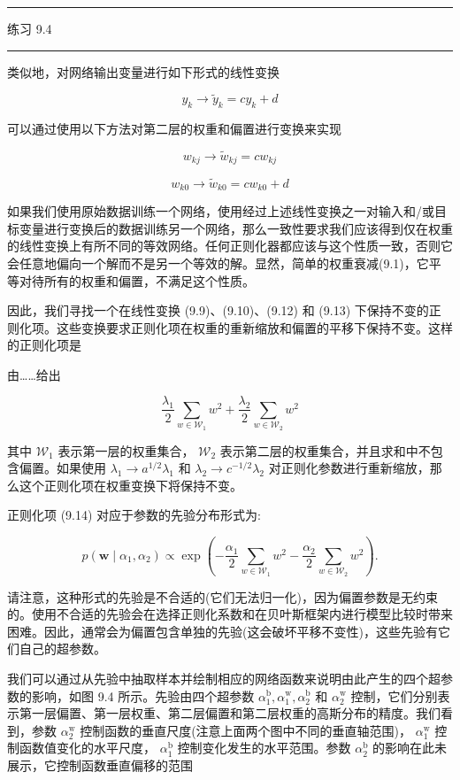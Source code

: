 \documentclass[10pt]{article}
\newcommand{\HRule}{\begin{center}\rule{0.9\linewidth}{0.2mm}\end{center}}
\begin{document}
\HRule

练习 9.4

\HRule

类似地，对网络输出变量进行如下形式的线性变换

\[
{y}_{k} \rightarrow  {\widetilde{y}}_{k} = c{y}_{k} + d \tag{9.11}
\]

可以通过使用以下方法对第二层的权重和偏置进行变换来实现

\[
{w}_{kj} \rightarrow  {\widetilde{w}}_{kj} = c{w}_{kj} \tag{9.12}
\]

\[
{w}_{k0} \rightarrow  {\widetilde{w}}_{k0} = c{w}_{k0} + d \tag{9.13}
\]

如果我们使用原始数据训练一个网络，使用经过上述线性变换之一对输入和/或目标变量进行变换后的数据训练另一个网络，那么一致性要求我们应该得到仅在权重的线性变换上有所不同的等效网络。任何正则化器都应该与这个性质一致，否则它会任意地偏向一个解而不是另一个等效的解。显然，简单的权重衰减(9.1)，它平等对待所有的权重和偏置，不满足这个性质。

因此，我们寻找一个在线性变换 (9.9)、(9.10)、(9.12) 和 (9.13) 下保持不变的正则化项。这些变换要求正则化项在权重的重新缩放和偏置的平移下保持不变。这样的正则化项是

由……给出

\[
\frac{{\lambda }_{1}}{2}\mathop{\sum }\limits_{{w \in  {\mathcal{W}}_{1}}}{w}^{2} + \frac{{\lambda }_{2}}{2}\mathop{\sum }\limits_{{w \in  {\mathcal{W}}_{2}}}{w}^{2} \tag{9.14}
\]

其中 \({\mathcal{W}}_{1}\) 表示第一层的权重集合， \({\mathcal{W}}_{2}\) 表示第二层的权重集合，并且求和中不包含偏置。如果使用 \({\lambda }_{1} \rightarrow  {a}^{1/2}{\lambda }_{1}\) 和 \({\lambda }_{2} \rightarrow  {c}^{-1/2}{\lambda }_{2}\) 对正则化参数进行重新缩放，那么这个正则化项在权重变换下将保持不变。

正则化项 (9.14) 对应于参数的先验分布形式为:

\[
p\left( {\mathbf{w} \mid  {\alpha }_{1},{\alpha }_{2}}\right)  \propto  \exp \left( {-\frac{{\alpha }_{1}}{2}\mathop{\sum }\limits_{{w \in  {\mathcal{W}}_{1}}}{w}^{2} - \frac{{\alpha }_{2}}{2}\mathop{\sum }\limits_{{w \in  {\mathcal{W}}_{2}}}{w}^{2}}\right) . \tag{9.15}
\]

请注意，这种形式的先验是不合适的(它们无法归一化)，因为偏置参数是无约束的。使用不合适的先验会在选择正则化系数和在贝叶斯框架内进行模型比较时带来困难。因此，通常会为偏置包含单独的先验(这会破坏平移不变性)，这些先验有它们自己的超参数。

我们可以通过从先验中抽取样本并绘制相应的网络函数来说明由此产生的四个超参数的影响，如图 9.4 所示。先验由四个超参数 \({\alpha }_{1}^{\mathrm{b}},{\alpha }_{1}^{\mathrm{w}},{\alpha }_{2}^{\mathrm{b}}\) 和 \({\alpha }_{2}^{\mathrm{w}}\) 控制，它们分别表示第一层偏置、第一层权重、第二层偏置和第二层权重的高斯分布的精度。我们看到，参数 \({\alpha }_{2}^{\mathrm{w}}\) 控制函数的垂直尺度(注意上面两个图中不同的垂直轴范围)， \({\alpha }_{1}^{\mathrm{w}}\) 控制函数值变化的水平尺度， \({\alpha }_{1}^{\mathrm{b}}\) 控制变化发生的水平范围。参数 \({\alpha }_{2}^{\mathrm{b}}\) 的影响在此未展示，它控制函数垂直偏移的范围
\end{document}

